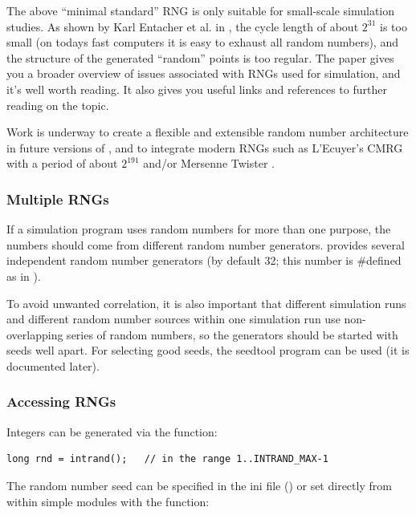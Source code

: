 The above ``minimal standard'' RNG is only suitable for small-scale
simulation studies. As shown by Karl Entacher et al. in \cite{Entacher02},
the cycle length of about $2^{31}$ is too small (on todays
fast computers it is easy to exhaust all random numbers), and
the structure of the generated ``random'' points is too regular.
The \cite{Hellekalek98} paper gives you a broader overview of issues
associated with RNGs used for simulation, and it's well worth reading.
It also gives you useful links and references to further reading
on the topic.

Work is underway to create a flexible and extensible
random number architecture in future versions of {\opp},
and to integrate modern RNGs such as L'Ecuyer's CMRG \cite{LEcuyer02}
with a period of about $2^{191}$ and/or
Mersenne Twister \cite{Matsumoto98}.


\subsubsection{Multiple RNGs}

If a simulation program uses random numbers for more than one purpose,
the numbers should come from different random number generators.
{\opp} provides several independent random number generators (by
default 32; this number is \#defined as
 in ).

To avoid unwanted correlation, it is also important that different
simulation runs and different random number sources within one
simulation run use non-overlapping series of random numbers,
so the generators should be started with seeds well apart. For
selecting good seeds, the seedtool program can be used (it is
documented later).


\subsubsection{Accessing RNGs}

Integers can be generated via the  function:

\begin{verbatim}
long rnd = intrand();   // in the range 1..INTRAND_MAX-1
\end{verbatim}

The random number seed can be specified in the ini file
() or set directly from within
simple modules with the 
function:

